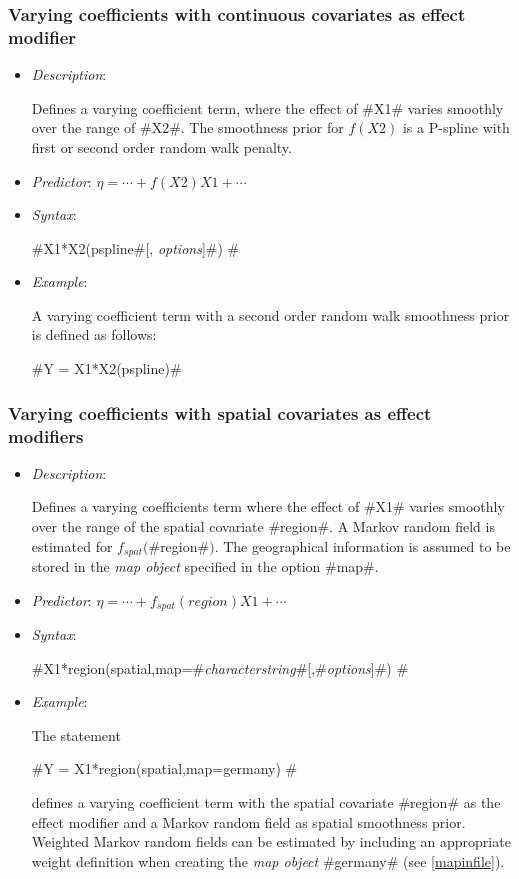 \subsubsection*{Varying coefficients with continuous covariates as
effect modifier}

\begin{itemize}

\item[] {\em Description}:

Defines a varying coefficient term, where the effect of #X1#
varies smoothly over the range of #X2#. The smoothness prior for
$f(X2)$ is a P-spline with first or second order random walk
penalty. \item[] {\em Predictor}: $\eta= \cdots + f(X2)X1 +
\cdots$ \item[] {\em Syntax}:

#X1*X2(pspline#[, {\em options}]#) #

\item[] {\em Example}:

A varying coefficient term with a second order random walk
smoothness prior is defined as follows:

#Y = X1*X2(pspline)#
\end{itemize}


\subsubsection*{Varying coefficients with spatial covariates as
effect modifiers}

\begin{itemize}
\item[] {\em Description}:

Defines a varying coefficients term where the effect of #X1#
varies smoothly over the range of the spatial covariate #region#.
A Markov random field is estimated for $f_{spat}($#region#$)$. The
geographical information is assumed to be stored in the {\em map
object} specified in the option #map#.

\item[] {\em Predictor}: $\eta = \cdots + f_{spat}(region)X1 +
\cdots$

\item[] {\em Syntax}:

#X1*region(spatial,map=#{\em characterstring}#[,#{\em options}]#) #
\item[] {\em Example}:

The statement

#Y = X1*region(spatial,map=germany) #

defines a varying coefficient term with the spatial covariate
#region# as the effect modifier and a Markov random field as spatial
smoothness prior. Weighted Markov random fields can be estimated by
including an appropriate weight definition when creating the {\em
map object} #germany# (see \autoref{mapinfile}).
\end{itemize}


